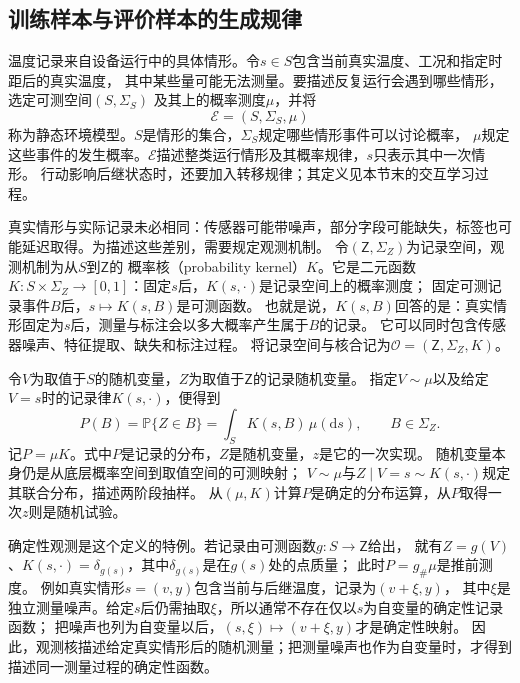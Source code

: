 \subsection{训练样本与评价样本的生成规律}
\label{sec:future-learning-data-objects}

温度记录来自设备运行中的具体情形。令$s\in S$包含当前真实温度、工况和指定时距后的真实温度，
其中某些量可能无法测量。要描述反复运行会遇到哪些情形，选定可测空间$(S,\Sigma_S)$
及其上的概率测度$\mu$，并将
\begin{equation}
  \mathcal E=(S,\Sigma_S,\mu)
  \label{eq:future-static-environment}
\end{equation}
称为静态环境模型。$S$是情形的集合，$\Sigma_S$规定哪些情形事件可以讨论概率，
$\mu$规定这些事件的发生概率。$\mathcal E$描述整类运行情形及其概率规律，$s$只表示其中一次情形。
行动影响后继状态时，还要加入转移规律；其定义见本节末的交互学习过程。

真实情形与实际记录未必相同：传感器可能带噪声，部分字段可能缺失，标签也可能延迟取得。为描述这些差别，需要规定观测机制。
令$(\mathsf Z,\Sigma_Z)$为记录空间，观测机制为从$S$到$\mathsf Z$的
概率核（probability kernel）$K$。它是二元函数
$K:S\times\Sigma_Z\to[0,1]$：固定$s$后，$K(s,\cdot)$是记录空间上的概率测度；
固定可测记录事件$B$后，$s\mapsto K(s,B)$是可测函数。
也就是说，$K(s,B)$回答的是：真实情形固定为$s$后，测量与标注会以多大概率产生属于$B$的记录。
它可以同时包含传感器噪声、特征提取、缺失和标注过程。
将记录空间与核合记为$\mathcal O=(\mathsf Z,\Sigma_Z,K)$。

令$V$为取值于$S$的随机变量，$Z$为取值于$\mathsf Z$的记录随机变量。
指定$V\sim\mu$以及给定$V=s$时的记录律$K(s,\cdot)$，便得到
\begin{equation}
  P(B)=\mathbb P\{Z\in B\}
      =\int_S K(s,B)\,\mu(\mathrm ds),
  \qquad B\in\Sigma_Z.
  \label{eq:future-observation-law}
\end{equation}
记$P=\mu K$。式中$P$是记录的分布，$Z$是随机变量，$z$是它的一次实现。
随机变量本身仍是从底层概率空间到取值空间的可测映射；
$V\sim\mu$与$Z\mid V=s\sim K(s,\cdot)$规定其联合分布，描述两阶段抽样。
从$(\mu,K)$计算$P$是确定的分布运算，从$P$取得一次$z$则是随机试验。

确定性观测是这个定义的特例。若记录由可测函数$g:S\to\mathsf Z$给出，
就有$Z=g(V)$、$K(s,\cdot)=\delta_{g(s)}$，其中$\delta_{g(s)}$是在$g(s)$处的点质量；
此时$P=g_{\#}\mu$是推前测度。
例如真实情形$s=(v,y)$包含当前与后继温度，记录为$(v+\xi,y)$，
其中$\xi$是独立测量噪声。给定$s$后仍需抽取$\xi$，所以通常不存在仅以$s$为自变量的确定性记录函数；
把噪声也列为自变量以后，$(s,\xi)\mapsto(v+\xi,y)$才是确定性映射。
因此，观测核描述给定真实情形后的随机测量；把测量噪声也作为自变量时，才得到描述同一测量过程的确定性函数。

